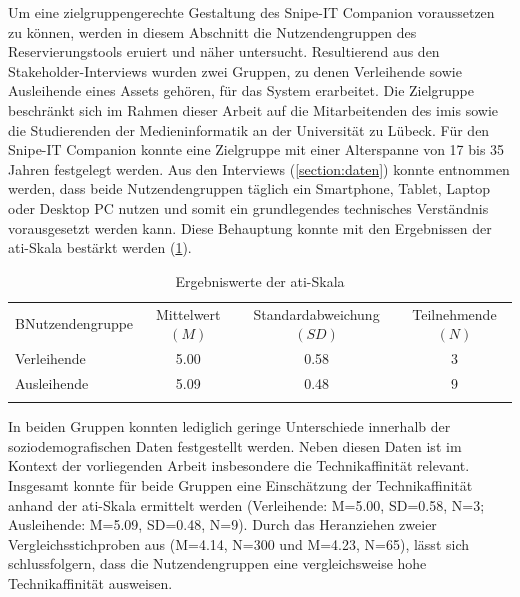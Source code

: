 \label{section:Nutzenden}
Um eine zielgruppengerechte Gestaltung des Snipe-IT Companion voraussetzen zu können, werden in
diesem Abschnitt die Nutzendengruppen des Reservierungstools eruiert und näher untersucht.
Resultierend aus den Stakeholder-Interviews wurden zwei Gruppen, zu denen Verleihende sowie
Ausleihende eines Assets gehören, für das System erarbeitet. Die Zielgruppe beschränkt sich im
Rahmen dieser Arbeit auf die Mitarbeitenden des \ac{imis} sowie die Studierenden der
Medieninformatik an der Universität zu Lübeck. Für den Snipe-IT Companion konnte eine Zielgruppe mit
einer Alterspanne von 17 bis 35 Jahren festgelegt werden. Aus den Interviews (\ref{section:daten})
konnte entnommen werden, dass beide Nutzendengruppen täglich ein Smartphone, Tablet, Laptop oder
Desktop PC nutzen und somit ein grundlegendes technisches Verständnis vorausgesetzt werden kann.
Diese Behauptung konnte mit den Ergebnissen der \ac{ati}-Skala bestärkt werden (\ref{table:ati}).

\begin{table}[h]
        \centering
        \caption{Ergebniswerte der \ac{ati}-Skala}
        \begin{tabular}{lccc}
                \arrayrulecolor{maincolor}\hline
                \sffamily\color{maincolor}BNutzendengruppe & \sffamily\color{maincolor}Mittelwert
                $(M)$                                    & \sffamily\color{maincolor}Standardabweichung $(SD)$ &
                \sffamily\color{maincolor}Teilnehmende $(N)$                                                          \\
                \arrayrulecolor{maincolor}\hline
                Verleihende                              & 5.00                                                & 0.58
                                                         & 3                                                          \\
                Ausleihende                              & 5.09                                                & 0.48
                                                         & 9                                                          \\
                \arrayrulecolor{maincolor}\hline
        \end{tabular}
        \label{table:ati}
\end{table}

In beiden Gruppen konnten lediglich geringe Unterschiede innerhalb der soziodemografischen Daten
festgestellt werden. Neben diesen Daten ist im Kontext der vorliegenden Arbeit insbesondere die
Technikaffinität relevant. Insgesamt konnte für beide Gruppen eine Einschätzung der Technikaffinität
anhand der \ac{ati}-Skala ermittelt werden (Verleihende: M=5.00, SD=0.58, N=3; Ausleihende: M=5.09,
SD=0.48, N=9). Durch das Heranziehen zweier Vergleichsstichproben aus 
(M=4.14, N=300 und M=4.23, N=65), lässt sich schlussfolgern, dass die Nutzendengruppen eine
vergleichsweise hohe Technikaffinität ausweisen.


